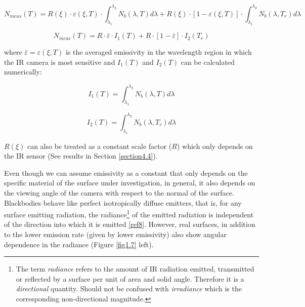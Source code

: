 		\begin{equation}\label{eq1.15}
			N_{meas}(T)= R(\xi) \cdot \varepsilon(\xi,T) \cdot \int_{\lambda_{1}}^{\lambda_{2}} N_{b}(\lambda,T) d\lambda + R(\xi) \cdot [1- \varepsilon(\xi,T)] \cdot \int_{\lambda_{1}}^{\lambda_{2}} N_{b}(\lambda,T_{r}) d\lambda
		\end{equation}	
		
		\begin{equation}\label{eq1.16}
			N_{meas}(T)= R \cdot \bar{\varepsilon} \cdot I_{1}(T) + R \cdot [1- \bar{\varepsilon}] \cdot I_{2}(T_{r})
		\end{equation}\bigskip
		
		where $\bar{\varepsilon}=\varepsilon(\xi,T)$ is the averaged emissivity in the wavelength region in which the IR camera is most sensitive and $I_{1}(T)$ and $I_{2}(T)$ can be calculated numerically:
		
		\begin{equation}\label{eq3.10}
			I_{1}(T)=\int_{\lambda_{1}}^{\lambda_{2}} N_{b}(\lambda,T) d\lambda
		\end{equation}
		
		\begin{equation}\label{eq3.11}
			I_{2}(T)=\int_{\lambda_{1}}^{\lambda_{2}} N_{b}(\lambda,T_{r}) d\lambda
		\end{equation}\bigskip
		
		$R(\xi)$ can also be treated as a constant scale factor ($R$) which only depends on the IR sensor (See results in Section \ref{section4.4}).
		
		Even though we can assume emissivity as a constant that only depends on the specific material of the surface under investigation, in general, it also depends on the viewing angle of the camera with respect to the normal of the surface. 
		Blackbodies behave like perfect isotropically diffuse emitters, that is, for any surface emitting radiation, the radiance\footnote{{\footnotesize The term \textit{radiance} refers to the amount of IR radiation emitted, transmitted or reflected by a surface per unit of area and solid angle. Therefore it is a \textit{directional} quantity. Should not be confused with \textit{irradiance} which is the corresponding non-directional magnitude.}} of the emitted radiation is independent of the direction into which it is emitted \ref{ref8}. However, real surfaces, in addition to the lower emission rate (given by lower emissivity) also show angular dependence in the radiance (Figure \ref{fig1.7} left).
		
